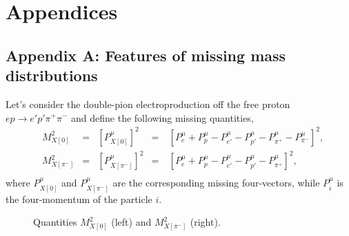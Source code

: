 

\appendix
    \makeatletter
   \renewcommand{\theequation}{\thechapter.\@arabic\c@equation}
    \makeatother
\chapter*{Appendices}
\label{app}

\renewcommand{\thesection}{A}
    \makeatletter
   \renewcommand{\theequation}{\thesection.\@arabic\c@equation}
    \makeatother
\section*{Appendix A: Features of missing mass distributions}
\label{app_mm_features}

Let's consider the double-pion electroproduction off the free proton $ep\rightarrow e'p'\pi^{+}\pi^{-}$ and define the following missing quantities,\vspace{-0.5em}
\begin{equation}
\begin{aligned}
&M_{X[0]}^{2}&=&\left [P_{X[0]}^{\mu} \right ]^{2}&=&~\left [P_{e}^{\mu} + P_{p}^{\mu}- P_{e'}^{\mu}- P_{p'}^{\mu}-  P_{\pi^{+}}^{\mu} - P_{\pi^{-}}^{\mu}\right ]^{2},\\
&M_{X[\pi^{-}]}^{2}&=&\left [P_{X[\pi^{-}]}^{\mu}\right ]^{2}&=&~\left [P_{e}^{\mu} + P_{p}^{\mu}- P_{e'}^{\mu}- P_{p'}^{\mu}-  P_{\pi^{+}}^{\mu}\right ]^{2},\\[-7pt]
\end{aligned}\label{eq:mm_def}
\end{equation}
where $P_{X[0]}^{\mu}$ and $P_{X[\pi^{-}]}^{\mu}$ are the corresponding missing four-vectors, while $P_{i}^{\mu}$ is the four-momentum of the particle $i$.
\begin{figure}[htp]
\begin{center}
\caption{\small Quantities $M_{X[0]}^{2}$ (left) and $M_{X[\pi^{-}]}^{2}$ (right).} \label{fig:norad_nofsi}
\end{center}
\end{figure}

